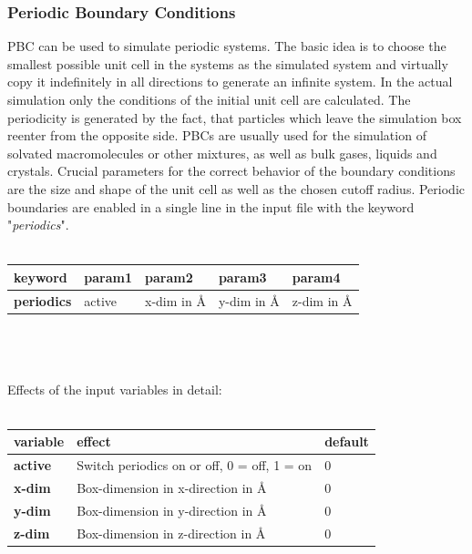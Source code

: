\documentclass[10pt,a4paper]{article} %
\begin{document}
	\subsubsection{Periodic Boundary Conditions}
	\acf{PBC} can be used to simulate periodic systems. The basic idea is to choose the smallest possible unit cell in the systems as the simulated system and virtually copy it indefinitely in all directions to generate an infinite system. In the actual simulation only the conditions of the initial unit cell are calculated. The periodicity is generated by the fact, that particles which leave the simulation box reenter from the opposite side. \acp{PBC} are usually used for the simulation of solvated macromolecules or other mixtures, as well as bulk gases, liquids and crystals. Crucial parameters for the correct behavior of the boundary conditions are the size and shape of the unit cell as well as the chosen cutoff radius. Periodic boundaries are enabled in a single line in the input file with the keyword "\textit{periodics}".\\~\\
	\begin{tabularx}{\textwidth}{l|X|X|X|X}
		\textbf{keyword} & param1 & param2 & param3 & param4 \\
		\hline
		\textbf{periodics} & active & x-dim in Å& y-dim in Å& z-dim in Å\\
	\end{tabularx}\\~\\~\\
	Effects of the input variables in detail:\\~\\
	\begin{tabularx}{\textwidth}{l|X|X}
		\textbf{variable} & effect & default \\
		\hline
		\textbf{active} & Switch periodics on or off, 0 = off, 1 = on & 0 \\
		\textbf{x-dim} & Box-dimension in x-direction in Å & 0 \\
		\textbf{y-dim} & Box-dimension in y-direction in Å & 0 \\
		\textbf{z-dim} & Box-dimension in z-direction in Å & 0 \\
	\end{tabularx}~\\

	\fi

\end{document}

